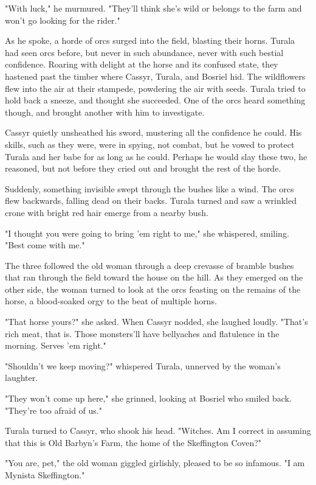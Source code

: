 "With luck," he murmured. "They'll think she's wild or belongs to the farm and won't go looking for the rider."

As he spoke, a horde of orcs surged into the field, blasting their horns. Turala had seen orcs before, but never in such abundance, never with such bestial confidence. Roaring with delight at the horse and its confused state, they hastened past the timber where Cassyr, Turala, and Bosriel hid. The wildflowers flew into the air at their stampede, powdering the air with seeds. Turala tried to hold back a sneeze, and thought she succeeded. One of the orcs heard something though, and brought another with him to investigate.

Cassyr quietly unsheathed his sword, mustering all the confidence he could. His skills, such as they were, were in spying, not combat, but he vowed to protect Turala and her babe for as long as he could. Perhaps he would slay these two, he reasoned, but not before they cried out and brought the rest of the horde.

Suddenly, something invisible swept through the bushes like a wind. The orcs flew backwards, falling dead on their backs. Turala turned and saw a wrinkled crone with bright red hair emerge from a nearby bush.

"I thought you were going to bring 'em right to me," she whispered, smiling. "Best come with me."

The three followed the old woman through a deep crevasse of bramble bushes that ran through the field toward the house on the hill. As they emerged on the other side, the woman turned to look at the orcs feasting on the remains of the horse, a blood-soaked orgy to the beat of multiple horns.

"That horse yours?" she asked. When Cassyr nodded, she laughed loudly. "That's rich meat, that is. Those monsters'll have bellyaches and flatulence in the morning. Serves 'em right."

"Shouldn't we keep moving?" whispered Turala, unnerved by the woman's laughter.

"They won't come up here," she grinned, looking at Bosriel who smiled back. "They're too afraid of us."

Turala turned to Cassyr, who shook his head. "Witches. Am I correct in assuming that this is Old Barbyn's Farm, the home of the Skeffington Coven?"

"You are, pet," the old woman giggled girlishly, pleased to be so infamous. "I am Mynista Skeffington."

